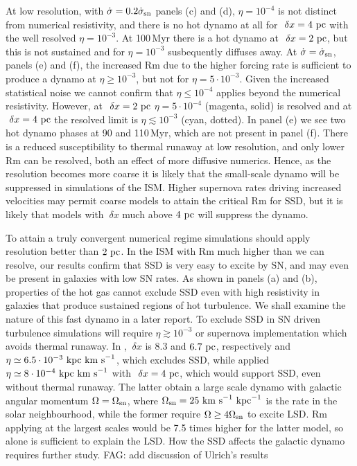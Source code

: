 \documentclass[preprint2]{aastex63}
\newcommand\SNr{\dot\sigma_{\rm sn}}
\newcommand\OSN{\Omega_{\rm sn}}
\newcommand\kpc{~ {\rm kpc}}
\newcommand\pc{~ {\rm pc}}
\newcommand\dx{~ {\delta x}}
\newcommand\kms{~ {\rm km~ s}^{-1}}
\newcommand{\fag}[1]{\textcolor{midgreen}{FAG: #1}}
\begin{document}
At low resolution, with $\dot\sigma=0.2\SNr$ panels (c) and (d), $\eta=10^{-4}$
is not distinct from numerical resistivity, and there is no hot dynamo at all
for $\dx=4\pc$ with the well resolved $\eta=10^{-3}$.
At 100\,Myr there is a hot dynamo at $\dx=2\pc$, but this is not
sustained and for $\eta=10^{-3}$ susbequently diffuses away.
At $\dot\sigma=\SNr$, panels (e) and (f), the increased Rm due to the 
higher forcing rate is sufficient to produce a dynamo at $\eta\geq10^{-3}$, but
not for $\eta=5\cdot10^{-3}$.
Given the increased statistical noise we cannot confirm that $\eta\leq10^{-4}$
applies beyond the numerical resistivity.
However, at $\dx=2\pc$ $\eta=5\cdot10^{-4}$ (magenta, solid) is resolved and at $\dx=4\pc$
 the resolved limit is $\eta\lesssim10^{-3}$ (cyan, dotted).
In panel (e) we see two hot dynamo phases at 90  and 110\,Myr, which are not 
present in panel (f).
There is a reduced susceptibility to thermal runaway at low resolution, 
and only lower Rm can be resolved, both an effect of more diffusive numerics.
Hence, as the resolution becomes more coarse it is likely that the small-scale 
dynamo will be suppressed in simulations of the ISM.
Higher supernova rates driving increased velocities may permit coarse models 
to attain the critical Rm for SSD, but it is likely that models with 
$\dx$ much above $4\pc$ will suppress the dynamo. 

To attain a truly convergent numerical regime simulations should apply 
resolution better than $2\pc$.
In the ISM with Rm much higher than we can resolve, our results confirm that
SSD is very easy to excite by SN, and may even be present in galaxies with
low SN rates.
As shown in panels (a) and (b), properties of the hot gas cannot exclude
SSD even with high resistivity in galaxies that produce sustained regions of
hot turbulence.
We shall examine the nature of this fast dynamo in a later report.
To exclude SSD in SN driven turbulence simulations will require
$\eta\gtrsim10^{-3}$ or supernova implementation which avoids thermal runaway.
In \citet{Gressel:2008,GE20}, $\dx$ is 8.3 and $6.7\pc$, respectively
and $\eta\simeq6.5\cdot10^{-3}\kpc\kms$, which excludes SSD,
while \citet{Gent:2013b} applied $\eta\simeq8\cdot10^{-4}\kpc\kms$ with $\dx=4\pc$,
which would support SSD, even without thermal runaway.
The latter obtain a large scale dynamo with galactic angular momentum
$\Omega=\OSN$, where $\OSN=25\kms\kpc^{-1}$ is the rate in the solar
neighbourhood, while the former require $\Omega\geq4\OSN$ to excite LSD.
Rm applying at the largest scales would be 7.5 times higher for the latter 
model, so alone is sufficient to explain the LSD.
How the SSD affects the galactic dynamo requires further study.
\fag{add discussion of Ulrich's results}
\end{document}
